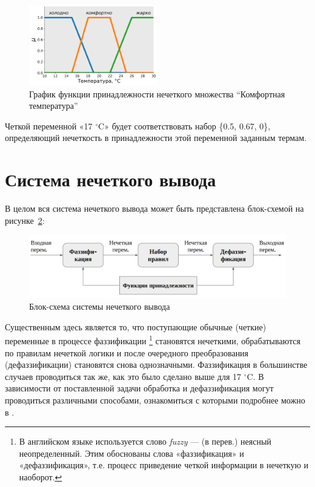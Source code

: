 \documentclass[a4paper,12pt]{article}
\begin{document}
	\begin{figure}[h]
		\centering
		\includegraphics[width=0.5\textwidth]{Figure_1_2}
		\caption{График функции принадлежности нечеткого множества ``Комфортная температура''}
		\label{fig:1_2}
	\end{figure}

	Четкой переменной «17 $^\circ$C» будет соответствовать набор \{0.5, 0.67, 0\}, определяющий нечеткость в принадлежности этой переменной заданным термам.
	
	\section{Система нечеткого вывода}
	В целом вся система нечеткого вывода может быть представлена блок-схемой на рисунке~\ref{schm:1}:
	
	\begin{figure}[h]
		\centering
		\includegraphics[width=1\textwidth]{scheme_1}
		\caption{Блок-схема системы нечеткого вывода}
		\label{schm:1}
	\end{figure}
	
	Существенным здесь является то, что поступающие обычные (четкие) переменные в процессе фаззификации \footnote{В английском языке используется слово \textit{fuzzy} — (в перев.) неясный неопределенный. Этим обоснованы слова «фаззификация» и «дефаззификация», т.е. процесс приведение четкой информации в нечеткую и наоборот.} становятся нечеткими, обрабатываются по правилам нечеткой логики и после очередного преобразования (дефаззификации) становятся снова однозначными. Фаззификация в большинстве случаев проводиться так же, как это было сделано выше для 17 $^\circ$C. В зависимости от поставленной задачи обработка и дефаззификация могут проводиться различными способами, ознакомиться с которыми подробнее можно в \cite{Dubya}.  
	
\end{document}
